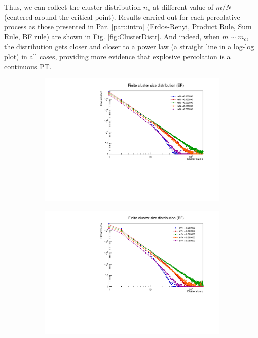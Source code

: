 Thus, we can collect the cluster distribution $n_s$ at different value of $m / N$ (centered around the critical point). Results carried out for each percolative process as those presented in Par. \ref{par::intro} (Erdos-Renyi, Product Rule, Sum Rule, BF rule) are shown in Fig. \ref{fig:ClusterDistr}. And indeed, when $m \sim m_c$, the distribution gets closer and closer to a power law (a straight line in a log-log plot) in all cases, providing more evidence that explosive percolation is a continuous PT.
\label{par:css}
\begin{figure}
	\centering
	\begin{subfigure}[b]{0.45\linewidth}
		\includegraphics[width=\linewidth]{images/ClusterDistrER.pdf}
	\end{subfigure}
	\hspace{0.5em}
	\begin{subfigure}[b]{0.45\linewidth}
		\includegraphics[width=\linewidth]{images/ClusterDistrBF.pdf}
	\end{subfigure}
	

\end{figure}
